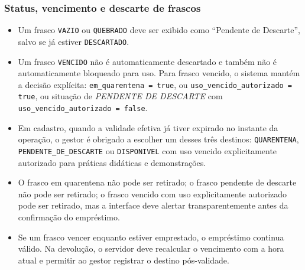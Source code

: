 \documentclass[12pt,a4paper]{article}
\begin{document}
\subsubsection{Status, vencimento e descarte de frascos}
\begin{regra}
\begin{itemize}
    \item Um frasco \texttt{VAZIO} ou \texttt{QUEBRADO} deve ser exibido como ``Pendente de Descarte'', salvo se já estiver \texttt{DESCARTADO}.
    \item Um frasco \texttt{VENCIDO} não é automaticamente descartado e também não é automaticamente bloqueado para uso. Para frasco vencido, o sistema mantém a decisão explícita: \texttt{em\_quarentena = true}, ou \texttt{uso\_vencido\_autorizado = true}, ou situação de \textit{PENDENTE DE DESCARTE} com \texttt{uso\_vencido\_autorizado = false}.
    \item Em cadastro, quando a validade efetiva já tiver expirado no instante da operação, o gestor é obrigado a escolher um desses três destinos: \texttt{QUARENTENA}, \texttt{PENDENTE\_DE\_DESCARTE} ou \texttt{DISPONIVEL} com uso vencido explicitamente autorizado para práticas didáticas e demonstrações.
    \item O frasco em quarentena não pode ser retirado; o frasco pendente de descarte não pode ser retirado; o frasco vencido com uso explicitamente autorizado pode ser retirado, mas a interface deve alertar transparentemente antes da confirmação do empréstimo.
    \item Se um frasco vencer enquanto estiver emprestado, o empréstimo continua válido. Na devolução, o servidor deve recalcular o vencimento com a hora atual e permitir ao gestor registrar o destino pós-validade.
\end{itemize}
\end{regra}
\end{document}
